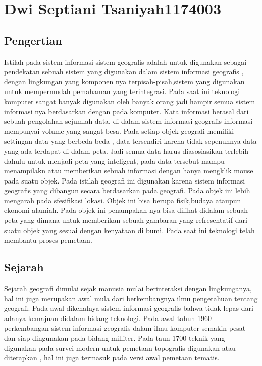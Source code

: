 \section{Dwi Septiani Tsaniyah{1174003}}

\subsection{Pengertian}
Istilah pada sistem informasi sistem geografis adalah untuk digunakan sebagai pendekatan sebuah sistem yang digunakan dalam sistem informasi geografis , dengan lingkungan yang komponen nya terpisah-pisah,sistem yang digunakan untuk mempermudah pemahaman yang terintegrasi. Pada saat ini teknologi komputer sangat banyak digunakan oleh banyak orang jadi hampir semua sistem informasi nya berdasarkan dengan pada komputer.
Kata informasi berasal dari sebuah pengolahan sejumlah data, di dalam sistem informasi geografis informasi mempunyai volume yang sangat besa. Pada setiap objek geografi memiliki settingan data yang berbeda beda , data tersendiri karena tidak sepenuhnya data yang ada terdapat di dalam peta. Jadi semua data harus diasosiasikan terlebih dahulu untuk menjadi peta yang inteligent, pada data tersebut mampu menampilakn atau memberikan sebuah informasi dengan hanya mengklik mouse pada suatu objek.
Pada istilah geografi ini digunakan karena sistem informasi geografis yang dibangun secara berdasarkan pada geografi. Pada objek ini lebih mengarah pada sfesifikasi lokasi. Objek ini bisa berupa fisik,budaya ataupun ekonomi alamiah. Pada objek ini penampakan nya bisa dilihat didalam sebuah peta yang dimana untuk memberikan sebuah gambaran yang refresentatif dari suatu objek yang sesuai dengan kenyataan di bumi. Pada saat ini teknologi telah membantu proses pemetaan.

\subsection{Sejarah}
Sejarah geografi dimulai sejak manusia mulai berinteraksi dengan lingkunganya, hal ini juga merupakan awal mula dari berkembangnya ilmu pengetahuan tentang geografi.
Pada awal dikenalnya sistem informasi geografis bahwa tidak lepas dari adanya kemajuan didalam bidang teknologi. Pada awal tahun 1960 perkembangan sistem informasi geografis dalam ilmu komputer semakin pesat dan siap dingunakan pada bidang milliter. Pada taun 1700 teknik yang digunakan pada survei modern untuk pemetaan topografis digunakan atau diterapkan , hal ini juga termasuk pada versi awal pemetaan tematis.

